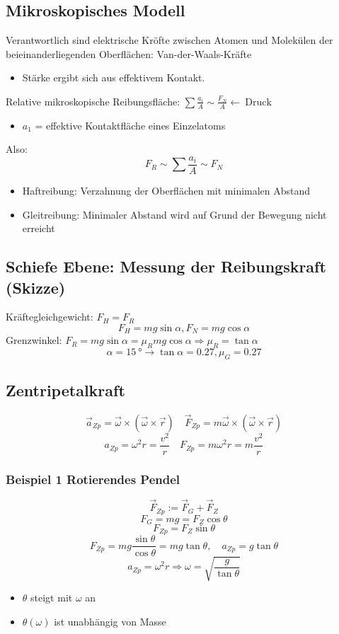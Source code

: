 \documentclass[a4paper]{scrartcl}
\renewcommand{\v}[1]{\vec{#1}}
\theoremstyle{definition}
\theoremstyle{plain}
\theoremstyle{plain}
\theoremstyle{remark}
\theoremstyle{remark}
\theoremstyle{remark}
\begin{document}
\subsection{Mikroskopisches Modell}
\label{sec-3-9}
Verantwortlich sind elektrische Kröfte zwischen Atomen und Molekülen der beieinanderliegenden Oberflächen: Van-der-Waals-Kräfte
\begin{itemize}
\item Stärke ergibt sich aus effektivem Kontakt.
\end{itemize}
Relative mikroskopische Reibungsfläche: $\sum \frac{a_i}{A} \sim \frac{F_N}{A} \leftarrow~\text{Druck}$
\begin{itemize}
\item $a_1$ = effektive Kontaktfläche eines Einzelatoms
\end{itemize}
Also: \[F_R \sim \sum \frac{a_i}{A} \sim F_N\]
\begin{itemize}
\item Haftreibung: Verzahnung der Oberflächen mit minimalen Abstand
\item Gleitreibung: Minimaler Abstand wird auf Grund der Bewegung nicht erreicht
\end{itemize}
\subsection{Schiefe Ebene: Messung der Reibungskraft (Skizze)}
\label{sec-3-10}
Kräftegleichgewicht: $F_H = F_R$
\[F_H = m g \sin{\alpha}, F_N = m g \cos{\alpha}\]
Grenzwinkel: $F_R = m g \sin{\alpha} = \mu_R m g \cos{\alpha} \Rightarrow \mu_R = \tan{\alpha}$
\[\alpha = \SI{15}{\degree} \rightarrow \tan{\alpha} = 0.27,\mu_G = 0.27\]
\subsection{Zentripetalkraft}
\label{sec-3-11}
\[\v a_{Zp} = \v \omega \times(\v\omega\times\v r)\quad \v{F}_{Zp} = m\v\omega\times(\v\omega\times\v r)\]
\[a_{Zp} = \omega^2 r = \frac{v^2}{r}\quad F_{Zp} = m\omega^2 r = m \frac{v^2}{r}\]
\subsubsection{Beispiel 1 Rotierendes Pendel}
\label{sec-3-11-1}
\[\v{F}_{Zp} := \v{F}_G + \v{F}_Z\]
\[F_G = m g = F_Z \cos{\theta}\]
\[F_{Zp} = F_Z \sin{\theta}\]
\[F_{Zp} = mg \frac{\sin{\theta}}{\cos{\theta}} = m g \tan{\theta},\quad a_{Zp} = g\tan{\theta}\]
\[a_{Zp} = \omega^2 r \Rightarrow \omega = \sqrt{\frac{g}{\tan{\theta}}}\]
\begin{itemize}
\item $\theta$ steigt mit $\omega$ an
\item $\theta(\omega)$ ist unabhängig von Masse
\end{itemize}
\end{document}
